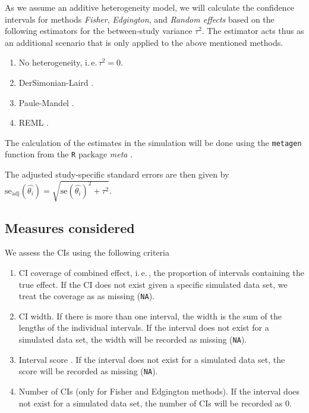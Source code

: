 \documentclass[letterpaper, 12pt]{article}
\newcommand{\ie}{{i.\,e.\,}}
\newcommand{\pkg}[1]{\textit{#1}}
\begin{document}
As we assume an additive heterogeneity model, we will calculate the confidence
intervals for methods \emph{Fisher}, \emph{Edgington}, and \emph{Random effects}
based on the following estimators for the between-study variance $\tau^2$. The
estimator acts thus as an additional scenario that is only applied to the above
mentioned methods.

\begin{enumerate}
  \item No heterogeneity, \ie $\tau^2 = 0$.
  \item DerSimonian-Laird \citep{ders:lair:86}.
  \item Paule-Mandel \citep{paul:man:82}.
  \item REML \citep{harv:77}.
\end{enumerate}

The calculation of the estimates in the simulation will be done using the
\texttt{metagen} function from the \texttt{R} package \pkg{meta} \citep{meta}.

The adjusted study-specific standard errors are then given by
$\text{se}_{\text{adj}}(\hat{\theta_i}) = \sqrt{\text{se}(\hat{\theta_i})^2 + \tau^2}$.

\subsection{Measures considered} \label{sec:meas}

We assess the CIs using the following criteria
\begin{enumerate}
  \item CI coverage of combined effect, \ie, the proportion of intervals
    containing the true effect. If the CI does not exist given a specific
    simulated data set, we treat the coverage as as missing (\texttt{NA}).
  \item CI width. If there is more than one interval, the width is the sum of
    the lengths of the individual intervals. If the interval does not exist for
    a simulated data set, the width will be recorded as missing (\texttt{NA}).
  \item Interval score \citep{Gnei:Raft:07}. If the interval does not exist for
    a simulated data set, the score will be recorded as missing (\texttt{NA}).
  \item Number of CIs (only for Fisher and Edgington methods). If the interval
    does not exist for a simulated data set, the number of CIs will be recorded as
    0. %
\end{enumerate}
\end{document}
